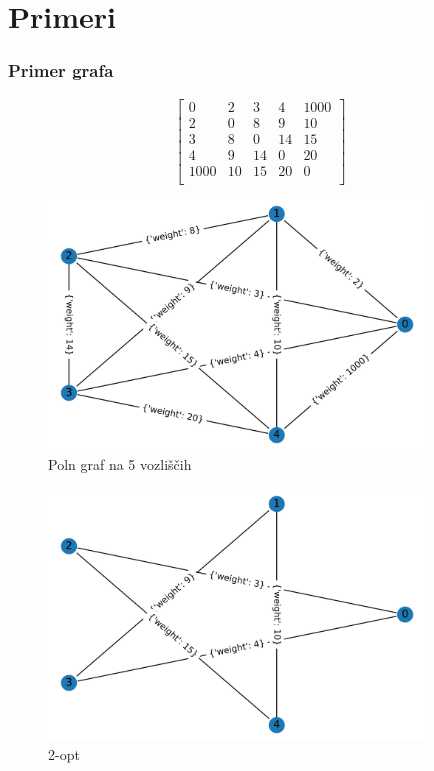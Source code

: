 \documentclass[8pt]{beamer}
\begin{document}
\section[Primeri]{Primeri}
\begin{frame}
\frametitle{Primer grafa}
\begin{equation}
\label{matrika}
\begin{bmatrix} 
0&2&3&4&1000\\
2&0&8&9&10\\
3&8&0&14&15\\
4&9&14&0&20\\
1000&10&15&20&0\\
\end{bmatrix}
\end{equation}
\end{frame}

\begin{frame}
  \begin{figure}
  \includegraphics[width=10cm]{primeri/primer1.png}
 	\caption{Poln graf na 5 vozliščih}
	\label{Slika 1}
	\end{figure}
\end{frame}

\begin{frame}
\begin{figure}
  \includegraphics[width=10cm]{primeri/primer1_2opt.png}
\caption{2-opt}
\label{Slika 2}
\end{figure}
\end{frame}
\end{document}
